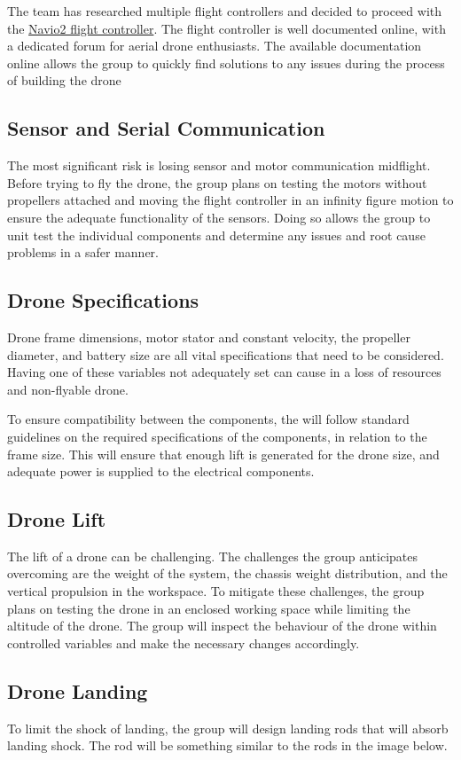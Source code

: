 \documentclass{article}
\begin{document}
The team has researched multiple flight controllers and decided to proceed with the \href{https://navio2.emlid.com/}{Navio2 flight controller}. The flight controller is well documented online, with a dedicated forum for aerial drone enthusiasts.  The available documentation online allows the group to quickly find solutions to any issues during the process of building the drone
\subsection{Sensor and Serial Communication}
The most significant risk is losing sensor and motor communication midflight. Before trying to fly the drone, the group plans on testing the motors without propellers attached and moving the flight controller in an infinity figure motion to ensure the adequate functionality of the sensors. Doing so allows the group to unit test the individual components and determine any issues and root cause problems in a safer manner.

\subsection{Drone Specifications}
Drone frame dimensions, motor stator and constant velocity, the propeller diameter, and battery size are all vital specifications that need to be considered. Having one of these variables not adequately set can cause in a loss of resources and non-flyable drone.

To ensure compatibility between the components, the will follow standard guidelines on the required specifications of the components, in relation to the frame size. This will ensure that enough lift is generated for the drone size, and adequate power is supplied to the electrical components.

\subsection{Drone Lift}
The lift of a drone can be challenging. The challenges the group anticipates overcoming are the weight of the system, the chassis weight distribution, and the vertical propulsion in the workspace. To mitigate these challenges, the group plans on testing the drone in an enclosed working space while limiting the altitude of the drone. The group will inspect the behaviour of the drone within controlled variables and make the necessary changes accordingly.

\subsection{Drone Landing}
 To limit the shock of landing, the group will design landing rods that will absorb landing shock. The rod will be something similar to the rods in the image below.\\
\end{document}

